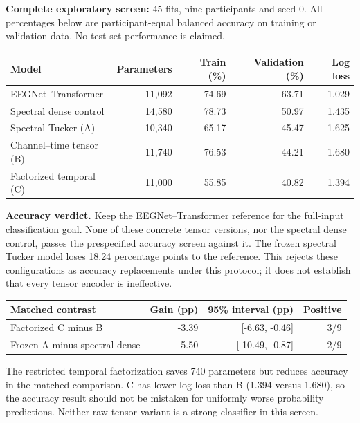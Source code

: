 \textbf{Complete exploratory screen:} 45 fits, nine participants and seed 0.
All percentages below are participant-equal balanced accuracy on training or
validation data. No test-set performance is claimed.
\begin{center}
\begin{tabular}{@{}lrrrr@{}}\toprule
Model & Parameters & Train (\%) & Validation (\%) & Log loss \\ \midrule
EEGNet--Transformer & 11,092 & 74.69 & 63.71 & 1.029 \\
Spectral dense control & 14,580 & 78.73 & 50.97 & 1.435 \\
Spectral Tucker (A) & 10,340 & 65.17 & 45.47 & 1.625 \\
Channel--time tensor (B) & 11,740 & 76.53 & 44.21 & 1.680 \\
Factorized temporal (C) & 11,000 & 55.85 & 40.82 & 1.394 \\
\bottomrule\end{tabular}\end{center}
\textbf{Accuracy verdict.} Keep the EEGNet--Transformer reference for the
full-input classification goal. None of these concrete tensor versions, nor
the spectral dense control, passes the prespecified accuracy screen against it.
The frozen spectral Tucker model loses 18.24 percentage points to the reference.
This rejects these configurations as accuracy replacements under this protocol;
it does not establish that every tensor encoder is ineffective.
\begin{center}\begin{tabular}{@{}lrrr@{}}\toprule
Matched contrast & Gain (pp) & 95\% interval (pp) & Positive \\ \midrule
Factorized C minus B & -3.39 & [-6.63, -0.46] & 3/9 \\
Frozen A minus spectral dense & -5.50 & [-10.49, -0.87] & 2/9 \\
\bottomrule\end{tabular}\end{center}
The restricted temporal factorization saves 740 parameters but reduces accuracy
in the matched comparison. C has lower log loss than B (1.394 versus 1.680),
so the accuracy result should not be mistaken for uniformly worse probability
predictions. Neither raw tensor variant is a strong classifier in this screen.
